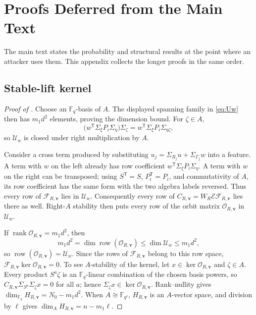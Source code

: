 \documentclass[11pt]{article}
\newcommand{\F}{\mathbb F}
\newcommand{\rank}{\operatorname{rank}}
\newcommand{\transpose}{\mathsf T}
\begin{document}
\appendix
\setcounter{section}{0}
\renewcommand{\thesection}{\Alph{section}}
\renewcommand{\theHsection}{app.\Alph{section}}


\section{Proofs Deferred from the Main Text}\label{app:deferred-proofs}

The main text states the probability and structural results at the point where
an attacker uses them.  This appendix collects the longer proofs in the same
order.

\subsection{Stable-lift kernel}\label{app:proof-stable-kernel}

\begin{proof}[Proof of ]
Choose an $\F_q$-basis of $A$.  The displayed spanning family in
\eqref{eq:Uw} then has $m_1d^2$ elements, proving the dimension bound.  For
$\zeta\in A$,
\[
 \bigl(w^\transpose\Sigma_\xi P_i\Sigma_\eta\bigr)\Sigma_\zeta
 =w^\transpose\Sigma_\xi P_i\Sigma_{\eta\zeta},
\]
so $\mathcal U_w$ is closed under right multiplication by $A$.

Consider a cross term produced by substituting
$u_j=\Sigma_{R_j}u+\Sigma_{\Gamma_j}w$ into a feature.  A term with $w$ on the left
already has row coefficient
$w^\transpose\Sigma_\xi P_i\Sigma_\eta$.  A term with $w$ on the right can be
transposed; using $S^\transpose=S$, $P_i^\transpose=P_i$, and commutativity of
$A$, its row coefficient has the same form with the two algebra labels
reversed.  Thus every row of $\mathcal F_{R,\mathbf v}$ lies in $\mathcal U_w$.
Consequently every row of
$C_{R,\mathbf v}=W_R\mathcal E\mathcal F_{R,\mathbf v}$ lies there as well.  Right-$A$
stability then puts every row of the orbit matrix $\mathcal O_{R,\mathbf v}$ in
$\mathcal U_w$.

If $\rank\mathcal O_{R,\mathbf v}=m_1d^2$, then
\[
 m_1d^2=\dim\operatorname{row}(\mathcal O_{R,\mathbf v})
 \le\dim\mathcal U_w\le m_1d^2,
\]
so $\operatorname{row}(\mathcal O_{R,\mathbf v})=\mathcal U_w$.  Since the rows of
$\mathcal F_{R,\mathbf v}$ belong to this row space,
$\mathcal F_{R,\mathbf v}\ker\mathcal O_{R,\mathbf v}=0$.  To see $A$-stability of the
kernel, let $x\in\ker\mathcal O_{R,\mathbf v}$ and $\zeta\in A$.  Every product
$S^a\zeta$ is an $\F_q$-linear combination of the chosen basis powers, so
$C_{R,\mathbf v}\Sigma_{S^a}\Sigma_\zeta x=0$ for all $a$; hence
$\Sigma_\zeta x\in\ker\mathcal O_{R,\mathbf v}$.  Rank--nullity gives
$\dim_{\F_q}H_{R,\mathbf v}=N_0-m_1d^2$.  When $A\cong\F_{q^\ell}$, $H_{R,\mathbf v}$ is an
$A$-vector space, and division by $\ell$ gives
$\dim_A H_{R,\mathbf v}=n-m_1\ell$.
\end{proof}
\end{document}
